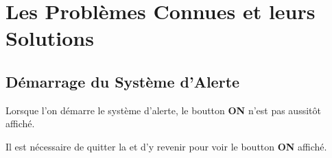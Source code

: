 \chapter{Les Probl\`emes Connues et leurs Solutions}\label{chap:problemes-connues}


\vspace{2cm}

\section{D\'emarrage du Syst\`eme d'Alerte}

Lorsque l'on d\'emarre le syst\`eme d'alerte,
le boutton \textbf{\textcolor{yerenColorGreen}{ON}}
n'est pas aussit\^ot affich\'e.

Il est n\'ecessaire de quitter la \fenetre et d'y
revenir pour voir le boutton \textbf{\textcolor{yerenColorGreen}{ON}}
affich\'e.
